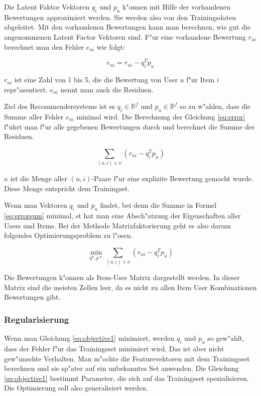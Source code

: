 \documentclass[a4paper, 12pt]{article}
\begin{document}
Die Latent Faktor Vektoren $q_i$ und $p_u$ k"onnen mit Hilfe der vorhandenen Bewertungen approximiert werden. Sie werden also von den Trainingsdaten abgeleitet. Mit den vorhandenen Bewertungen kann man berechnen, wie gut die angenommenen Latent Factor Vektoren sind. F"ur eine vorhandene Bewertung $r_{ui}$ berechnet man den Fehler $e_{ui}$ wie folgt:

\begin{equation}
  \label{eq:error}
  e_{ui} = r_{ui} - q_i^T p_u
\end{equation}

$r_{ui}$ ist eine Zahl von 1 bis 5, die die Bewertung von User $u$ f"ur Item $i$ repr"asentiert. $e_{ui}$ nennt man auch die Residuen.

Ziel des Recommendersystems ist es $q_i \in \mathbb{R}^f$ und $p_u \in \mathbb{R}^f$ so zu w"ahlen, dass die Summe aller Fehler $e_{ui}$ minimal wird. Die Berechnung der Gleichung \ref{eq:error} f"uhrt man f"ur alle gegebenen Bewertungen durch und berechnet die Summe der Residuen.

\begin{equation}
\label{eq:errorsum}
  \sum_{(u,i) \in \kappa} (r_{ui} - q_i^T p_u)
\end{equation}

$\kappa$ ist die Menge aller $(u,i)$-Paare f"ur eine explizite Bewertung gemacht wurde. Diese Menge entspricht dem Trainingset.

Wenn man Vektoren $q_i$ und $p_u$ findet, bei denn die Summe in Formel \ref{eq:errorsum} minimal, st hat man eine Absch"atzung der Eigenschaften aller Users und Items. Bei der Methode Matrixfaktorierung geht es also darum folgendes Optimierungsproblem zu l"osen.

\begin{equation}
  \min_{q*,p*} \sum_{(u,i) \in \kappa} (r_{ui} - q_i^T p_u)
  \label{eq:objective1}
\end{equation}

 Die Bewertungen k"onnen als Item-User Matrix dargestellt werden. In dieser Matrix sind die meisten Zellen leer, da es nicht zu allen Item User Kombinationen Bewertungen gibt. 


\subsubsection{Regularisierung}
\label{sec:regularization}

Wenn man Gleichung \ref{eq:objective1} minimiert, werden $q_i$ und $p_u$ so gew"ahlt, dass der Fehler f"ur das Trainingsset minimiert wird. Das ist aber nicht gew"unschte Verhalten. Man m"ochte die Featurevektoren mit dem Trainingsset berechnen und sie sp"ater auf ein unbekanntes Set anwenden. Die Gleichung \ref{eq:objective1} bestimmt Parameter, die sich auf das Trainingsset spezialisieren. Die Optimierung soll also generalisiert werden.
\end{document}
